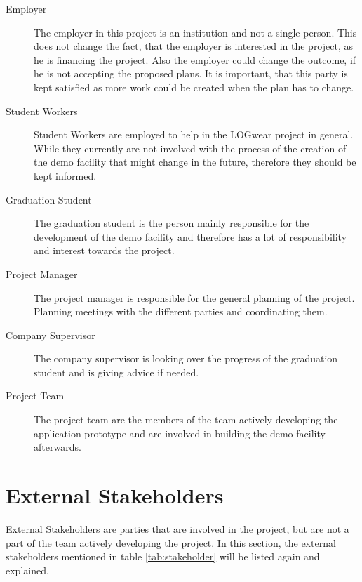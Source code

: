 \begin{description}
	\item[Employer] \hfill
	
	The employer in this project is an institution and not a single person. This does not change the fact, that the employer is interested in the project, as he is financing the project. Also the employer could change the outcome, if he is not accepting the proposed plans. It is important, that this party is kept satisfied as more work could be created when the plan has to change.
	\item[Student Workers] \hfill
	
	Student Workers are employed to help in the LOGwear project in general. While they currently are not involved with the process of the creation of the demo facility that might change in the future, therefore they should be kept informed.
	\item[Graduation Student] \hfill
	
	The graduation student is the person mainly responsible for the development of the demo facility and therefore has a lot of responsibility and interest towards the project.
	\item[Project Manager] \hfill
	
	The project manager is responsible for the general planning of the project. Planning meetings with the different parties and coordinating them.
	\item[Company Supervisor] \hfill
	
	The company supervisor is looking over the progress of the graduation student and is giving advice if needed. 
	\item[Project Team] \hfill
	
	The project team are the members of the team actively developing the application prototype and are involved in building the demo facility afterwards.
\end{description}

\section{External Stakeholders}\label{sec:externalStakeholders}
External Stakeholders are parties that are involved in the project, but are not a part of the team actively developing the project. In this section, the external stakeholders mentioned in table \ref{tab:stakeholder} will be listed again and explained.


